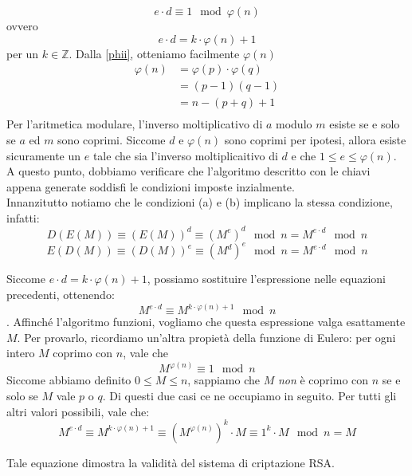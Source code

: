 \documentclass[italian,A4,12pt]{article}
\begin{document}
      $$e\cdot d \equiv 1 \mod{\varphi(n)}$$
      ovvero
      $$e\cdot d = k\cdot \varphi(n) +1$$
      per un $k\in\mathbb{Z}$.
      Dalla \eqref{phii}, otteniamo facilmente $\varphi(n)$
      \begin{align*}
        \varphi(n) &= \varphi(p)\cdot\varphi(q)\\
        &= (p-1)(q-1)\\
        &= n-(p+q)+1\\
      \end{align*}
      Per l'aritmetica modulare, l'inverso moltiplicativo di $a$ modulo $m$ esiste se e solo se $a$ ed $m$ sono coprimi. Siccome $d$ e $\varphi(n)$ sono coprimi per ipotesi, allora esiste sicuramente un $e$ tale che sia l'inverso moltiplicaitivo di $d$ e che $1\leq e \leq \varphi(n)$.\\
      A questo punto, dobbiamo verificare che l'algoritmo descritto con le chiavi appena generate soddisfi le condizioni imposte inzialmente.\\
      Innanzitutto notiamo che le condizioni (a) e (b) implicano la stessa condizione, infatti:
      $$D(E(M))\equiv (E(M))^d\equiv (M^e)^d \mod{n}=M^{e\cdot d} \mod{n}$$
      $$E(D(M))\equiv (D(M))^e\equiv (M^d)^e \mod{n}=M^{e\cdot d} \mod{n}$$

      Siccome $e\cdot d=k\cdot \varphi(n)+1$, possiamo sostituire l'espressione nelle equazioni precedenti, ottenendo:
      $$M^{e\cdot d}\equiv M^{k\cdot \varphi(n)+1} \mod{n}$$.
      Affinché l'algoritmo funzioni, vogliamo che questa espressione valga esattamente $M$. Per provarlo, ricordiamo un'altra propietà della funzione di Eulero: per ogni intero $M$ coprimo con $n$, vale che
      $$M^{\varphi(n)}\equiv 1 \mod{n}$$
      Siccome abbiamo definito $0\leq M \leq n$, sappiamo che $M$ \textit{non} è coprimo con $n$ se e solo se $M$ vale $p$ o $q$. Di questi due casi ce ne occupiamo in seguito.
      Per tutti gli altri valori possibili, vale che:
      $$M^{e\cdot d}\equiv M^{k\cdot \varphi(n)+1}\equiv \left(M^{\varphi(n)}\right)^k\cdot M \equiv 1^k\cdot M \mod{n}=M$$

      Tale equazione dimostra la validità del sistema di criptazione RSA.
\end{document}
